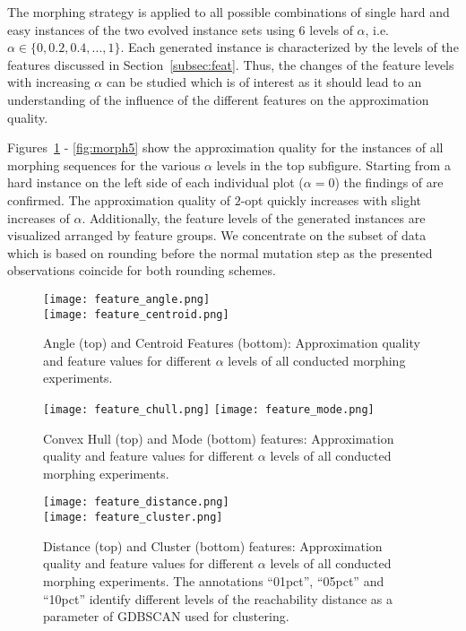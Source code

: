 \documentclass{article}
\begin{document}
The morphing strategy is applied to all possible combinations of single
hard and easy instances of the two evolved instance sets using 6
levels of $\alpha$, i.e. $\alpha \in \{0,0.2,0.4,...,1\}$. Each
generated instance is characterized by the levels of the features
discussed in Section~\ref{subsec:feat}. Thus, the changes of the
feature levels with increasing $\alpha$ can be studied which is of
interest as it should lead to an understanding of the influence of the
different features on the approximation quality.

Figures~\ref{fig:morph1} - \ref{fig:morph5} show the approximation
quality for the instances of all morphing sequences for the various
$\alpha$ levels in the top subfigure. Starting from a hard instance on
the left side of each individual plot ($\alpha=0$) the findings of
\cite{EnglertRV07} are confirmed. The approximation quality of $2$-opt
quickly increases with slight increases of $\alpha$. Additionally, the
feature levels of the generated instances are visualized arranged by
feature groups. We concentrate on the subset of data which is based on
rounding before the normal mutation step as the presented observations
coincide for both rounding schemes.

\begin{figure}
  \centering
  \texttt{[image: feature\_angle.png]} \\\vspace*{0.3cm}
  \texttt{[image: feature\_centroid.png]}
  \caption{Angle (top) and Centroid Features (bottom): Approximation
    quality and feature values for different $\alpha$ levels of all
    conducted morphing experiments.}
  \label{fig:morph1}
\end{figure}

\begin{figure}
  \centering
  \texttt{[image: feature\_chull.png]}\vspace*{0.3cm}
  \texttt{[image: feature\_mode.png]}
  \caption{Convex Hull (top) and Mode (bottom) features: Approximation quality and feature values for different
    $\alpha$ levels of all conducted morphing experiments. }
  \label{fig:morph2}
\end{figure}

\begin{figure}
  \centering
  \texttt{[image: feature\_distance.png]}\\ \vspace*{0.3cm}
  \texttt{[image: feature\_cluster.png]}
  \caption{Distance (top) and Cluster (bottom) features: Approximation
    quality and feature values for different $\alpha$ levels of all
    conducted morphing experiments. The annotations ``01pct'',
    ``05pct'' and ``10pct'' identify different levels of the
    reachability distance as a parameter of GDBSCAN \cite{Sander98}
    used for clustering.}
  \label{fig:morph3}
\end{figure}
\end{document}

